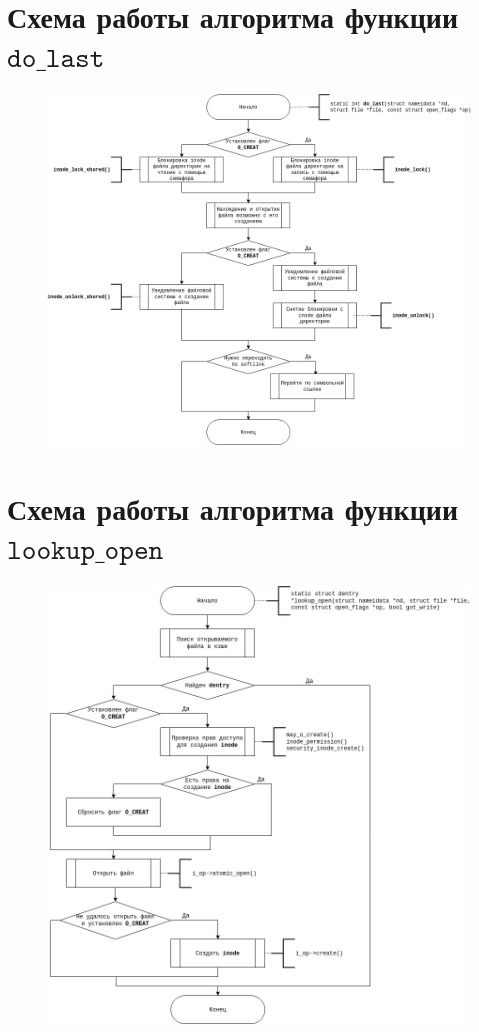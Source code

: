\documentclass[12pt]{report}
\begin{document}
\section{Схема работы алгоритма функции $\texttt{do\_last}$}

\begin{figure}[H]
	\centering
	\includegraphics[scale=0.52]{img/do_last.jpg}
	\label{fig:do_last}
\end{figure}

\section{Схема работы алгоритма функции $\texttt{lookup\_open}$}

\begin{figure}[H]
	\centering
	\includegraphics[scale=0.6]{img/lookup_open.jpg}
	\label{fig:lookup_open}
\end{figure}

	
\end{document}
